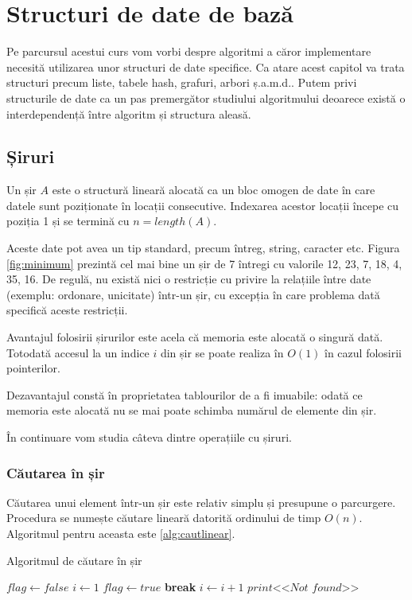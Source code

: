\chapter{Structuri de date de bază}
\label{struct}%

Pe parcursul acestui curs vom vorbi despre algoritmi a căror implementare necesită utilizarea unor structuri de date specifice.
Ca atare acest capitol va trata structuri precum liste, tabele hash, grafuri, arbori ș.a.m.d.. Putem privi structurile de date ca un pas premergător studiului algoritmului deoarece există o interdependență între algoritm și structura aleasă.



\section{Șiruri}

Un șir $A$ este o structură lineară alocată ca un bloc omogen de date în care datele sunt poziționate în locații consecutive. Indexarea acestor locații începe cu poziția 1 și se termină cu $n=length(A)$. 

Aceste date pot avea un tip standard, precum întreg, string, caracter etc. Figura \ref{fig:minimum} prezintă cel mai bine un șir de 7 întregi cu valorile {12, 23, 7, 18, 4, 35, 16}. De regulă, nu există nici o restricție cu privire la relațiile între date (exemplu: ordonare, unicitate) într-un șir, cu excepția în care problema dată specifică aceste restricții.

Avantajul folosirii șirurilor este acela că memoria este alocată o singură dată. Totodată accesul la un indice $i$ din șir se poate realiza în $O(1)$ în cazul folosirii pointerilor.

Dezavantajul constă în proprietatea tablourilor de a fi imuabile: odată ce memoria este alocată nu se mai poate schimba numărul de elemente din șir.

În continuare vom studia câteva dintre operațiile cu șiruri.

\subsection{Căutarea în șir}

Căutarea unui element într-un șir este relativ simplu și presupune o parcurgere. Procedura se numește căutare lineară datorită ordinului de timp $O(n)$. Algoritmul pentru aceasta este \ref{alg:cautlinear}.

\begin{algorithm}[H]
	\caption{Algoritmul de căutare în șir}\label{alg:cautlinear}
	\begin{algorithmic}[1]
		\State $flag \gets false$
		\State $i \gets 1$
		\State $flag \gets true$
		\State \textbf{break}
		\EndIf 
		\State $i \gets i+1$
		\EndWhile 
		\State $print \textit{<<Not found>>}$
		\EndIf 
		\EndProcedure
	\end{algorithmic}
\end{algorithm}

